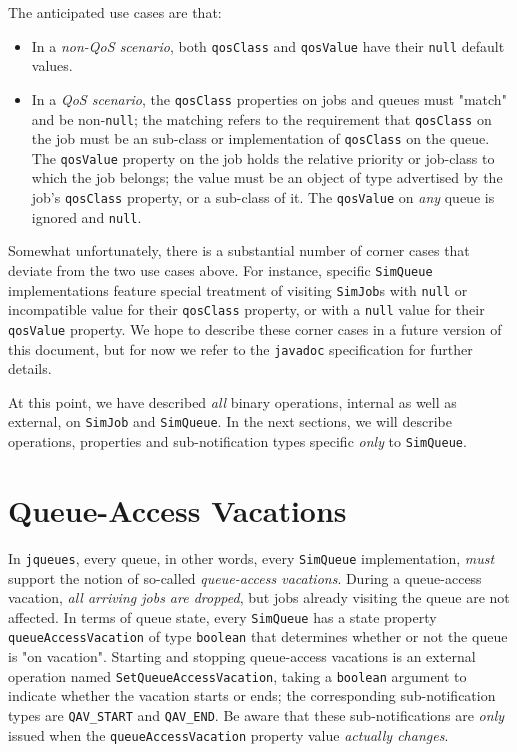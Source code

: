 The anticipated use cases are that:
\begin{itemize}
\item
  In a {\em non-QoS scenario},
    both \lstinline|qosClass|
    and \lstinline|qosValue|
    have their \lstinline|null|
    default values.
\item
  In a {\em QoS scenario},
    the \lstinline|qosClass| properties
    on jobs and queues must "match"
    and be non-\lstinline|null|;
    the matching refers to the requirement
    that \lstinline|qosClass| on the job
    must be an sub-class or implementation
    of \lstinline|qosClass| on the queue.
  The \lstinline|qosValue| property
    on the job holds the relative priority
    or job-class to which the job belongs;
    the value must be an object of type
    advertised by the job's \lstinline|qosClass|
    property, or a sub-class of it.
  The \lstinline|qosValue|
    on {\em any\/} queue is ignored and
    \lstinline|null|.
\end{itemize}
Somewhat unfortunately,
  there is a substantial number of corner cases
  that deviate from the two use cases above.
For instance,
  specific \lstinline|SimQueue| implementations
  feature special treatment of
  visiting \lstinline|SimJob|s
  with \lstinline|null|
  or incompatible value
  for their \lstinline|qosClass|
  property,
  or with a \lstinline|null| value
  for their \lstinline|qosValue|
  property.
We hope to describe these corner cases
  in a future version of this document,
  but for now we refer
  to the \lstinline|javadoc|
  specification for further details.

At this point,
  we have described {\em all\/}
  binary operations,
  internal as well as external,
  on \lstinline|SimJob| and \lstinline|SimQueue|.
In the next sections,
  we will describe operations, properties
  and sub-notification types specific
  {\em only\/} to \lstinline|SimQueue|.
   
\section{Queue-Access Vacations}
\label{sec:guided:qav}

In \lstinline|jqueues|, every queue,
  in other words, every \lstinline|SimQueue| implementation,
  {\em must\/} support the notion
  of so-called {\em queue-access vacations}.
During a queue-access vacation,
  {\em all arriving jobs are dropped},
  but jobs already visiting
  the queue are not affected.
In terms of queue state,
  every \lstinline|SimQueue| has a state
  property \lstinline|queueAccessVacation|
  of type \lstinline|boolean|
  that determines whether or not the
  queue is "on vacation".
Starting and stopping queue-access vacations
  is an external operation named \lstinline|SetQueueAccessVacation|,
  taking a \lstinline|boolean| argument
  to indicate whether the vacation starts or ends;
  the corresponding sub-notification types
  are \lstinline|QAV_START|
  and \lstinline|QAV_END|.
Be aware that these sub-notifications
  are {\em only\/} issued when the
  \lstinline|queueAccessVacation|
  property value
  {\em actually changes}.

